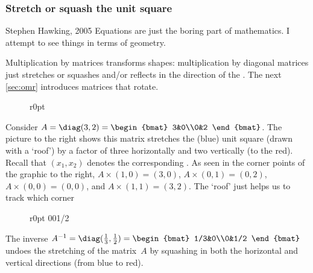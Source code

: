 \subsubsection{Stretch or squash the unit square}

\begin{quoted}{Stephen Hawking, 2005}
Equations are just the boring part of mathematics.  
I attempt to see things in terms of geometry.
\end{quoted}


Multiplication by matrices transforms shapes:
multiplication by diagonal matrices just stretches or squashes and/or reflects in the direction of the .
The next \cref{sec:omr} introduces matrices that rotate.



\begin{wrapfigure}r{0pt}  \end{wrapfigure}
\begin{example} 
Consider \(A=\diag(3,2)=\begin{bmat} 3&0\\0&2 \end{bmat}\). 
The  picture to the right shows this matrix stretches the (blue) unit square (drawn with a `roof') by a factor of three horizontally and two vertically (to the red). 
Recall that \((x_1,x_2)\) denotes the corresponding .  
As seen in the corner points of the graphic to the right,  \(A\times(1,0)=(3,0)\), \(A\times(0,1)=(0,2)\), \(A\times(0,0)=(0,0)\),  and \(A\times(1,1)=(3,2)\).   
The `roof' just helps us to track which corner 

\begin{wrapfigure}r{0pt} 00{1/2} \end{wrapfigure}
The inverse \(A^{-1}=\diag(\frac13,\frac12)=\begin{bmat} 1/3&0\\0&1/2 \end{bmat}\) undoes the stretching of the matrix~\(A\) by squashing in both the horizontal and vertical directions (from blue to red).  
\aqed

\end{example}




